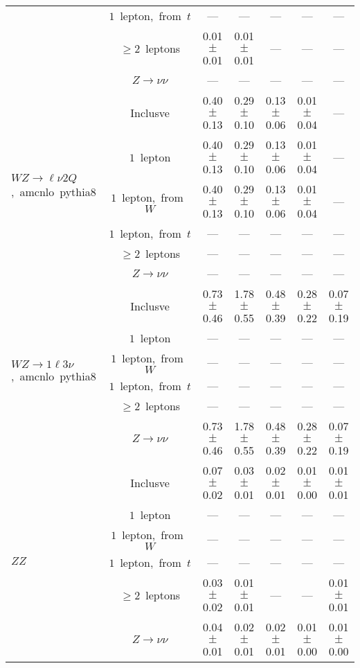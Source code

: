 \documentclass{article}
\begin{document}
\begin{longtable}{|l|c|c|c|c|c|c|}
 & $1$~lepton,~from~$t$  & ---  & ---  & ---  & ---  & --- \\* 
 & $\ge2$~leptons  & 0.01 $\pm$ 0.01  & 0.01 $\pm$ 0.01  & ---  & ---  & --- \\* 
 & $Z\rightarrow\nu\nu$  & ---  & ---  & ---  & ---  & --- \\* 
\hline 
\multirow{6}{*}{$WZ{\rightarrow}{\ell}{\nu}2Q$,~amcnlo~pythia8} & Inclusve  & 0.40 $\pm$ 0.13  & 0.29 $\pm$ 0.10  & 0.13 $\pm$ 0.06  & 0.01 $\pm$ 0.04  & --- \\* 
 & $1$~lepton  & 0.40 $\pm$ 0.13  & 0.29 $\pm$ 0.10  & 0.13 $\pm$ 0.06  & 0.01 $\pm$ 0.04  & --- \\* 
 & $1$~lepton,~from~$W$  & 0.40 $\pm$ 0.13  & 0.29 $\pm$ 0.10  & 0.13 $\pm$ 0.06  & 0.01 $\pm$ 0.04  & --- \\* 
 & $1$~lepton,~from~$t$  & ---  & ---  & ---  & ---  & --- \\* 
 & $\ge2$~leptons  & ---  & ---  & ---  & ---  & --- \\* 
 & $Z\rightarrow\nu\nu$  & ---  & ---  & ---  & ---  & --- \\* 
\hline 
\multirow{6}{*}{$WZ{\rightarrow}1{\ell}3{\nu}$,~amcnlo~pythia8} & Inclusve  & 0.73 $\pm$ 0.46  & 1.78 $\pm$ 0.55  & 0.48 $\pm$ 0.39  & 0.28 $\pm$ 0.22  & 0.07 $\pm$ 0.19 \\* 
 & $1$~lepton  & ---  & ---  & ---  & ---  & --- \\* 
 & $1$~lepton,~from~$W$  & ---  & ---  & ---  & ---  & --- \\* 
 & $1$~lepton,~from~$t$  & ---  & ---  & ---  & ---  & --- \\* 
 & $\ge2$~leptons  & ---  & ---  & ---  & ---  & --- \\* 
 & $Z\rightarrow\nu\nu$  & 0.73 $\pm$ 0.46  & 1.78 $\pm$ 0.55  & 0.48 $\pm$ 0.39  & 0.28 $\pm$ 0.22  & 0.07 $\pm$ 0.19 \\* 
\hline 
\multirow{6}{*}{$ZZ$} & Inclusve  & 0.07 $\pm$ 0.02  & 0.03 $\pm$ 0.01  & 0.02 $\pm$ 0.01  & 0.01 $\pm$ 0.00  & 0.01 $\pm$ 0.01 \\* 
 & $1$~lepton  & ---  & ---  & ---  & ---  & --- \\* 
 & $1$~lepton,~from~$W$  & ---  & ---  & ---  & ---  & --- \\* 
 & $1$~lepton,~from~$t$  & ---  & ---  & ---  & ---  & --- \\* 
 & $\ge2$~leptons  & 0.03 $\pm$ 0.02  & 0.01 $\pm$ 0.01  & ---  & ---  & 0.01 $\pm$ 0.01 \\* 
 & $Z\rightarrow\nu\nu$  & 0.04 $\pm$ 0.01  & 0.02 $\pm$ 0.01  & 0.02 $\pm$ 0.01  & 0.01 $\pm$ 0.00  & 0.01 $\pm$ 0.00 \\* 

\end{longtable}
\end{document}
